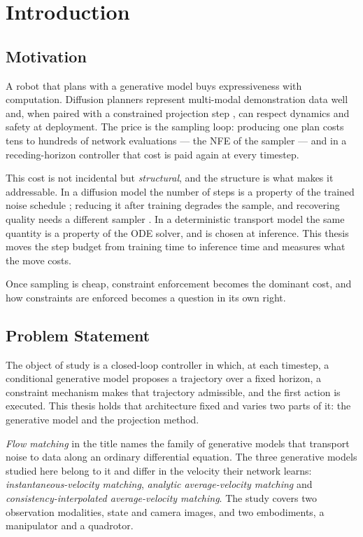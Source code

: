\chapter{Introduction}\label{ch:introduction}

\section{Motivation}\label{sec:intro:motivation}

A robot that plans with a generative model buys expressiveness with computation. Diffusion
planners \parencite{janner2022planning,chi2023diffusion} represent multi-modal demonstration data
\parencite{jia2024towards} well and, when paired with a constrained projection step
\parencite{romer2025diffusion}, can respect dynamics and safety at deployment. The price is the sampling
loop: producing one plan costs tens to hundreds of network evaluations --- the \ac{NFE} of the
sampler --- and in a receding-horizon controller that cost is paid again at every timestep.

This cost is not incidental but \emph{structural}, and the structure is what makes it
addressable. In a diffusion model the number of steps is a
property of the trained noise schedule \parencite{ho2020denoising}; reducing it after training
degrades the sample, and recovering quality needs a different sampler
\parencite{song2021denoising}. In a deterministic transport model \parencite{lipman2023flow} the same
quantity is a property of the \ac{ODE} solver, and is chosen at inference. This thesis moves the
step budget from training time to inference time and measures what the move costs.

Once sampling is cheap, constraint enforcement becomes the dominant cost, and how constraints are
enforced becomes a question in its own right.

\section{Problem Statement}\label{sec:intro:problem}

The object of study is a closed-loop controller in which, at each timestep, a conditional
generative model proposes a trajectory over a fixed horizon, a constraint mechanism makes
that trajectory admissible, and the first action is executed. This thesis holds that
architecture fixed and varies two parts of it: the generative model and the projection method.

\emph{Flow matching} in the title names the family of generative models that transport noise to data
along an ordinary differential equation. The three generative models studied here belong to it and
differ in the velocity their network learns: \emph{instantaneous-velocity matching},
\emph{analytic average-velocity matching} and \emph{consistency-interpolated average-velocity
matching}. The study covers two observation modalities, state and camera images, and two embodiments, a manipulator
and a quadrotor.

